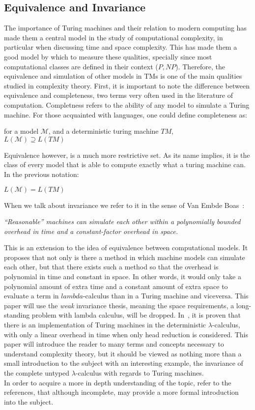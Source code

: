 \documentclass[12pt]{article}
\begin{document}
\subsection{Equivalence and Invariance}
The importance of Turing machines and their relation to modern computing has made them a central model in the study of computational complexity, in particular when discussing time and space complexity. This has made them a good model by which to measure these qualities, specially since most computational classes are defined in their context ($P, NP$). Therefore, the equivalence and simulation of other models in TMs is one of the main qualities studied in complexity theory.
First, it is important to note the difference between equivalence and completeness, two terms very often used in the literature of computation. Completness refers to the ability of any model to simulate a Turing machine. For those acquainted with languages, one could define completeness as:
\begin{center}
  for a model $\mathcal{M}$, and a deterministic turing machine $TM$, \\
  $L(\mathcal{M}) \supseteq L(TM)$
\end{center}
Equivalence however, is a much more restrictive set. As its name implies, it is the class of every model that is able to compute exactly what a turing machine can. In the previous notation:
\begin{center}
  $L(\mathcal{M}) = L(TM)$
\end{center}
When we talk about invariance we refer to it in the sense of Van Embde Boas~\cite{machine-models}: \\
\begin{center}
 \textit{\enquote{Reasonable} machines can simulate each other within a polynomially
bounded overhead in time and a constant-factor overhead in space.}
\end{center}
This is an extension to the idea of equivalence between computational models. It proposes that not only is there a method in which machine models can simulate each other, but that there exists such a method so that the overhead is polynomial in time and constant in space. In other words, it would only take a polynomial amount of extra time and a constant amount of extra space to evaluate a term in $lambda$-calculus than in a Turing machine and viceversa.
This paper will use the \textit{weak} invariance thesis, meaning the space requirements, a long-standing problem with lambda calculus, will be dropped.
In~\cite{invariance-of-cost-model}, it is proven that there is an implementation of Turing machines in the deterministic $\lambda$-calculus, with only a linear overhead in time when only head reduction is considered. This paper will introduce the reader to many terms and concepts necessary to understand complexity theory, but it should be viewed as nothing more than a small introduction to the subject with an interesting example, the invariance of the complete untyped $\lambda$-calculus with regards to Turing machines. \\
In order to acquire a more in depth understanding of the topic, refer to the references, that although incomplete, may provide a more formal introduction into the subject.
\end{document}
